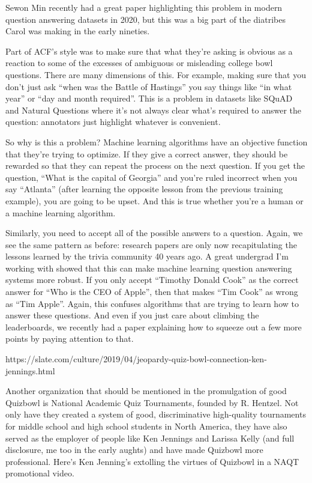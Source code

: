 Sewon Min recently had a great paper highlighting this problem in modern question answering datasets in 2020, but this was a big part of the diatribes Carol was making in the early nineties.

Part of ACF's style was to make sure that what they’re asking is obvious as a reaction to some of the excesses of ambiguous or misleading college bowl questions.  There are many dimensions of this.  For example, making sure that you don’t just ask “when was the Battle of Hastings” you say things like “in what year” or “day and month required”.  This is a problem in datasets like SQuAD and Natural Questions where it’s not always clear what’s required to answer the question: annotators just highlight whatever is convenient.

So why is this a problem?  Machine learning algorithms have an objective function that they’re trying to optimize.  If they give a correct answer, they should be rewarded so that they can repeat the process on the next question.  If you get the question, “What is the capital of Georgia” and you’re ruled incorrect when you say “Atlanta” (after learning the opposite lesson from the previous training example), you are going to be upset.  And this is true whether you’re a human or a machine learning algorithm.

Similarly, you need to accept all of the possible answers to a question.  Again, we see the same pattern as before: research papers are only now recapitulating the lessons learned by the trivia community 40 years ago.  A great undergrad I’m working with showed that this can make machine learning question answering systems more robust.  If you only accept “Timothy Donald Cook” as the correct answer for “Who is the CEO of Apple”, then that makes “Tim Cook” as wrong as “Tim Apple”.  Again, this confuses algorithms that are trying to learn how to answer these questions.  And even if you just care about climbing the leaderboards, we recently had a paper explaining how to squeeze out a few more points by paying attention to that.

https://slate.com/culture/2019/04/jeopardy-quiz-bowl-connection-ken-jennings.html

Another organization that should be mentioned in the promulgation of good Quizbowl is National Academic Quiz Tournaments, founded by R. Hentzel.  Not only have they created a system of good, discriminative high-quality tournaments for middle school and high school students in North America, they have also served as the employer of people like Ken Jennings and Larissa Kelly (and full disclosure, me too in the early aughts) and have made Quizbowl more professional.  Here’s Ken Jenning’s extolling the virtues of Quizbowl in a NAQT promotional video.

